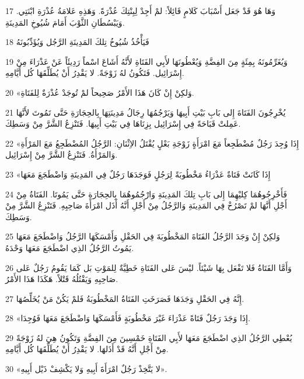 \par 17 وَهَا هُوَ قَدْ جَعَل أَسْبَابَ كَلامٍ قَائِلاً: لمْ أَجِدْ لِبِنْتِكَ عُذْرَةً. وَهَذِهِ عَلامَةُ عُذْرَةِ ابْنَتِي. وَيَبْسُطَانِ الثَّوْبَ أَمَامَ شُيُوخِ المَدِينَةِ.
\par 18 فَيَأْخُذُ شُيُوخُ تِلكَ المَدِينَةِ الرَّجُل وَيُؤَدِّبُونَهُ
\par 19 وَيُغَرِّمُونَهُ بِمِئَةٍ مِنَ الفِضَّةِ وَيُعْطُونَهَا لأَبِي الفَتَاةِ لأَنَّهُ أَشَاعَ اسْماً رَدِيئَاً عَنْ عَذْرَاءَ مِنْ إِسْرَائِيل. فَتَكُونُ لهُ زَوْجَةً. لا يَقْدِرُ أَنْ يُطَلِّقَهَا كُل أَيَّامِهِ.
\par 20 «وَلكِنْ إِنْ كَانَ هَذَا الأَمْرُ صَحِيحاً لمْ تُوجَدْ عُذْرَةٌ لِلفَتَاةِ.
\par 21 يُخْرِجُونَ الفَتَاةَ إِلى بَابِ بَيْتِ أَبِيهَا وَيَرْجُمُهَا رِجَالُ مَدِينَتِهَا بِالحِجَارَةِ حَتَّى تَمُوتَ لأَنَّهَا عَمِلتْ قَبَاحَةً فِي إِسْرَائِيل بِزِنَاهَا فِي بَيْتِ أَبِيهَا. فَتَنْزِعُ الشَّرَّ مِنْ وَسَطِكَ.
\par 22 «إِذَا وُجِدَ رَجُلٌ مُضْطَجِعاً مَعَ امْرَأَةٍ زَوْجَةِ بَعْلٍ يُقْتَلُ الاِثْنَانِ: الرَّجُلُ المُضْطَجِعُ مَعَ المَرْأَةِ وَالمَرْأَةُ. فَتَنْزِعُ الشَّرَّ مِنْ إِسْرَائِيل.
\par 23 «إِذَا كَانَتْ فَتَاةٌ عَذْرَاءُ مَخْطُوبَةً لِرَجُلٍ فَوَجَدَهَا رَجُلٌ فِي المَدِينَةِ وَاضْطَجَعَ مَعَهَا
\par 24 فَأَخْرِجُوهُمَا كِليْهِمَا إِلى بَابِ تِلكَ المَدِينَةِ وَارْجُمُوهُمَا بِالحِجَارَةِ حَتَّى يَمُوتَا. الفَتَاةُ مِنْ أَجْلِ أَنَّهَا لمْ تَصْرُخْ فِي المَدِينَةِ وَالرَّجُلُ مِنْ أَجْلِ أَنَّهُ أَذَل امْرَأَةَ صَاحِبِهِ. فَتَنْزِعُ الشَّرَّ مِنْ وَسَطِكَ.
\par 25 وَلكِنْ إِنْ وَجَدَ الرَّجُلُ الفَتَاةَ المَخْطُوبَةَ فِي الحَقْلِ وَأَمْسَكَهَا الرَّجُلُ وَاضْطَجَعَ مَعَهَا يَمُوتُ الرَّجُلُ الذِي اضْطَجَعَ مَعَهَا وَحْدَهُ.
\par 26 وَأَمَّا الفَتَاةُ فَلا تَفْعَل بِهَا شَيْئاً. ليْسَ عَلى الفَتَاةِ خَطِيَّةٌ لِلمَوْتِ بَل كَمَا يَقُومُ رَجُلٌ عَلى صَاحِبِهِ وَيَقْتُلُهُ قَتْلاً. هَكَذَا هَذَا الأَمْرُ.
\par 27 إِنَّهُ فِي الحَقْلِ وَجَدَهَا فَصَرَخَتِ الفَتَاةُ المَخْطُوبَةُ فَلمْ يَكُنْ مَنْ يُخَلِّصُهَا.
\par 28 «إِذَا وَجَدَ رَجُلٌ فَتَاةً عَذْرَاءَ غَيْرَ مَخْطُوبَةٍ فَأَمْسَكَهَا وَاضْطَجَعَ مَعَهَا فَوُجِدَا.
\par 29 يُعْطِي الرَّجُلُ الذِي اضْطَجَعَ مَعَهَا لأَبِي الفَتَاةِ خَمْسِينَ مِنَ الفِضَّةِ وَتَكُونُ هِيَ لهُ زَوْجَةً مِنْ أَجْلِ أَنَّهُ قَدْ أَذَلهَا. لا يَقْدِرُ أَنْ يُطَلِّقَهَا كُل أَيَّامِهِ.
\par 30 «لا يَتَّخِذْ رَجُلٌ امْرَأَةَ أَبِيهِ وَلا يَكْشِفْ ذَيْل أَبِيهِ».

